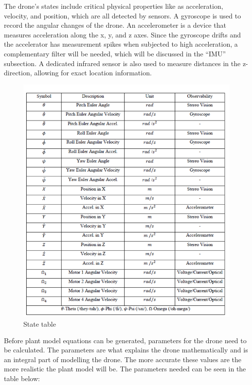 The drone's states include critical physical properties like as acceleration, velocity, and position, which are all detected by sensors. A gyroscope is used to record the angular changes of the drone. An accelerometer is a device that measures acceleration along the x, y, and z axes. Since the gyroscope drifts and the accelerator has measurement spikes when subjected to high acceleration, a complementary filter will be needed, which will be discussed in the “IMU” subsection. A dedicated infrared sensor is also used to measure distances in the z-direction, allowing for exact location information.

\begin{figure}[H]
\begin{center}
    \includegraphics[scale =1]{pictures/control/State table.png}
\end{center}
\caption{State table}
\end{figure}

Before plant model equations can be generated, parameters for the drone need to be calculated. The parameters are what explains the drone mathematically and is an integral part of modelling the drone. The more accurate these values are the more realistic the plant model will be.
The parameters needed can be seen in the table below:\cite{Ferry}

